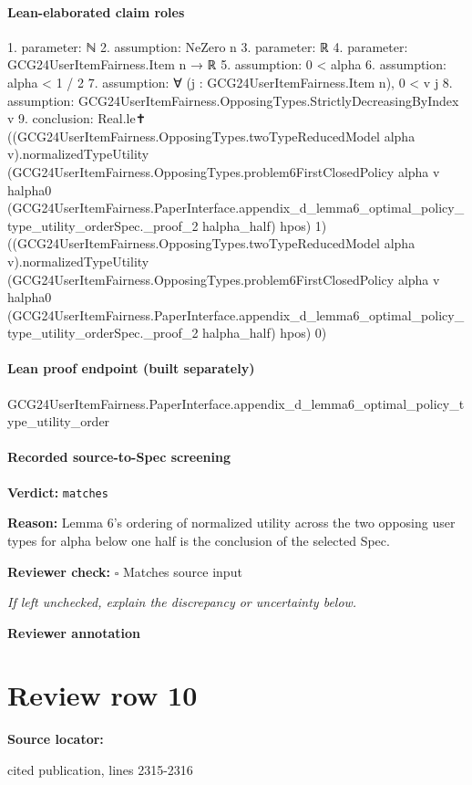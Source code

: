\documentclass[10pt]{article}
\newcommand{\reviewerbox}{%
  \par\noindent\fbox{\parbox{0.96\linewidth}{\rule{0pt}{0.38in}}}\par
}
\newcommand{\reviewmatch}[1]{%
  \par\noindent\textbf{Reviewer check:} $\square$\; #1\par
  \noindent\emph{If left unchecked, explain the discrepancy or uncertainty below.}\par
}
\begin{document}
\paragraph{Lean-elaborated claim roles}\begin{ReviewVerbatim}
1. parameter: ℕ
2. assumption: NeZero n
3. parameter: ℝ
4. parameter: GCG24UserItemFairness.Item n → ℝ
5. assumption: 0 < alpha
6. assumption: alpha < 1 / 2
7. assumption: ∀ (j : GCG24UserItemFairness.Item n), 0 < v j
8. assumption: GCG24UserItemFairness.OpposingTypes.StrictlyDecreasingByIndex v
9. conclusion: Real.le✝
  ((GCG24UserItemFairness.OpposingTypes.twoTypeReducedModel alpha v).normalizedTypeUtility
    (GCG24UserItemFairness.OpposingTypes.problem6FirstClosedPolicy alpha v halpha0
      (GCG24UserItemFairness.PaperInterface.appendix_d_lemma6_optimal_policy_type_utility_orderSpec._proof_2
        halpha_half)
      hpos)
    1)
  ((GCG24UserItemFairness.OpposingTypes.twoTypeReducedModel alpha v).normalizedTypeUtility
    (GCG24UserItemFairness.OpposingTypes.problem6FirstClosedPolicy alpha v halpha0
      (GCG24UserItemFairness.PaperInterface.appendix_d_lemma6_optimal_policy_type_utility_orderSpec._proof_2
        halpha_half)
      hpos)
    0)
\end{ReviewVerbatim}

\paragraph{Lean proof endpoint (built separately)}\begin{ReviewVerbatim}
GCG24UserItemFairness.PaperInterface.appendix_d_lemma6_optimal_policy_type_utility_order
\end{ReviewVerbatim}

\paragraph{Recorded source-to-Spec screening}
\textbf{Verdict:} \texttt{matches}
\\
{\raggedright
\textbf{Reason:} Lemma 6's ordering of normalized utility across the two opposing user types for alpha below one half is the conclusion of the selected Spec.\allowbreak{}
\par}
\reviewmatch{Matches source input}
\noindent\textbf{Reviewer annotation}\par
\reviewerbox
\clearpage
\hypertarget{source-claim-9c661bd3034e665b}{}
\section*{Review row 10}
\textbf{Source locator:} {\footnotesize\raggedright cited publication, lines 2315-\allowbreak{}2316\par}
\end{document}
